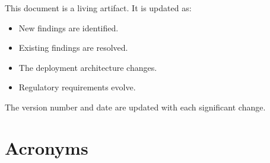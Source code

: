 This document is a living artifact. It is updated as:
\begin{itemize}
    \item New findings are identified.
    \item Existing findings are resolved.
    \item The deployment architecture changes.
    \item Regulatory requirements evolve.
\end{itemize}

The version number and date are updated with each significant change.

\newpage
\section*{Acronyms}

